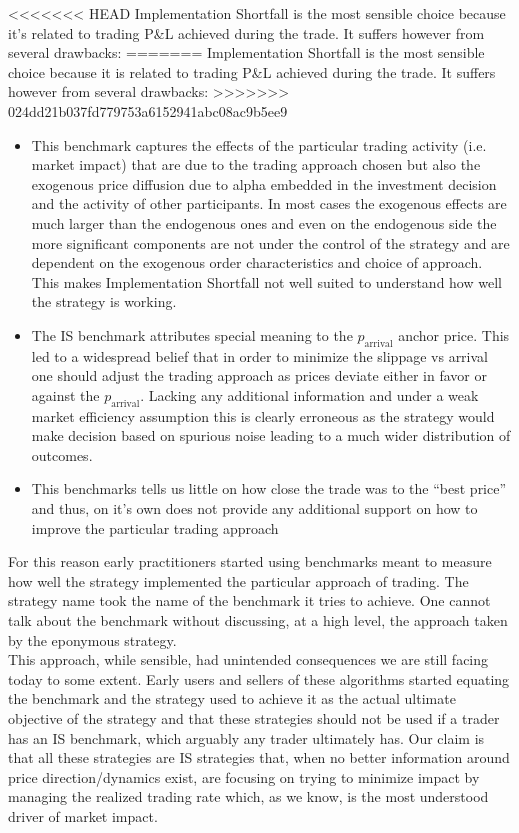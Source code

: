 <<<<<<< HEAD
Implementation Shortfall is the most sensible choice because it's related to trading P\&L achieved during the trade.  It suffers however from several drawbacks:
=======
Implementation Shortfall is the most sensible choice because it is related to trading P\&L achieved during the trade.  It suffers however from several drawbacks:
>>>>>>> 024dd21b037fd779753a6152941abc08ac9b5ee9
\begin{itemize}
\item This benchmark captures the effects of the particular trading activity (i.e. market impact) that are due to the trading approach chosen but also the exogenous price diffusion due to alpha embedded in the investment decision and the activity of other participants. In most cases the exogenous effects are much larger than the endogenous ones and even on the endogenous side the more significant components are not under the control of the strategy and are dependent on the exogenous order characteristics and choice of approach. This makes Implementation Shortfall not well suited to understand how well the strategy is working.
\item The IS benchmark attributes special meaning to the $p_{\text{arrival}}$ anchor price. This led to a widespread belief that in order to minimize the slippage vs arrival one should adjust the trading approach as prices deviate either in favor or against the   $p_{\text{arrival}}$. Lacking any additional information and under a weak market efficiency assumption this is clearly erroneous as the strategy would make decision based on spurious noise leading to a much wider distribution of outcomes.
\item This benchmarks tells us little on how close the trade was to the ``best price'' and thus, on it's own does not provide any additional support on how to improve the particular trading approach
\end{itemize}

For this reason early practitioners started using benchmarks meant to measure how well the strategy implemented the particular approach of trading. The strategy name took the name of the benchmark it tries to achieve. One cannot talk about the benchmark without discussing, at a high level, the approach taken by the  eponymous strategy. \\

This approach, while sensible, had unintended consequences we are still facing today to some extent. Early users and sellers of these algorithms started equating the benchmark and the strategy used to achieve it as the actual ultimate objective of the strategy and that these strategies should not be used if a trader has an IS benchmark, which arguably any trader ultimately has. Our claim is that all these strategies are IS strategies that, when no better information around price direction/dynamics exist, are focusing on trying to minimize impact by managing the realized trading rate which, as we know, is the most understood driver of market impact.

